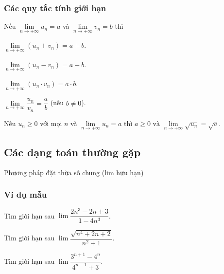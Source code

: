 \begin{tomtat}
\subsubsection{Các quy tắc tính giới hạn}
\begin{tc} 
	\begin{enumEX}[a)]{1}
		\item Nếu $\lim \limits_{n \rightarrow+\infty} u_{n}=a$ và $\lim \limits_{n \rightarrow+\infty} v_{n}=b$ thì 
		\begin{enumEX}[-)]{2}
			\item 	$\lim \limits_{n \rightarrow+\infty}\left(u_{n}+v_{n}\right)=a+b$.
			\item   $\lim \limits_{n \rightarrow+\infty}\left(u_{n}-v_{n}\right)=a-b$. 
			\item $\lim \limits_{n \rightarrow+\infty}\left(u_{n} \cdot v_{n}\right)=a \cdot b$.
			\item $\lim \limits_{n \rightarrow+\infty} \dfrac{u_{n}}{v_{n}}=\dfrac{a}{b}$ (nếu $b \neq 0$).
		\end{enumEX}
		\item Nếu $u_{n} \geq 0$ với mọi $n$ và $\lim \limits_{n \rightarrow+\infty} u_{n}=a$ thì $
		a \geq 0 \text { và } \lim \limits_{n \rightarrow+\infty} \sqrt{u_{n}}=\sqrt{a}$.
	\end{enumEX}
	
\end{tc}
\end{tomtat}
\subsection{Các dạng toán thường gặp}
\begin{dang}{Phương pháp đặt thừa số chung (lim hữu hạn)}
	
\end{dang}
\subsubsection{Ví dụ mẫu}
\begin{vd}%
	Tìm giới hạn sau $\lim\dfrac{2n^3-2n+3}{1-4n^3}$.
	\loigiai{
		\[\lim\dfrac{2n^3-2n+3}{1-4n^3}=\lim\dfrac{2-\dfrac{2}{n^2}+\dfrac{3}{n^3}}{\dfrac{1}{n^3}-4}=-\dfrac{1}{2}.\]}
\end{vd}
\begin{vd}%
	Tìm giới hạn sau $\lim\dfrac{\sqrt{n^4+2n+2}}{n^2+1}$.
	\loigiai{
		\[\lim\dfrac{\sqrt{n^4+2n+2}}{n^2+1} = \lim\dfrac{\sqrt{1+\dfrac{2}{n^3}+\dfrac{2}{n^4}}}{1+\dfrac{1}{n^2}}=1.\]}
\end{vd}
\begin{vd}%
	Tìm giới hạn sau $\lim\dfrac{3^{n+1}-4^n}{4^{n-1}+3}$.
	\loigiai{
		\[\lim\dfrac{3^{n+1}-4^n}{4^{n-1}+3} = \lim\dfrac{9\cdot 3^{n-1}-4\cdot 4^{n-1}}{4^{n-1}+3}=\lim\dfrac{9\cdot\left(\dfrac{3}{4}\right)^{n-1}-4}{1+3\cdot\left(\dfrac{1}{4}\right)^{n-1}}=-4.\]}
\end{vd}

